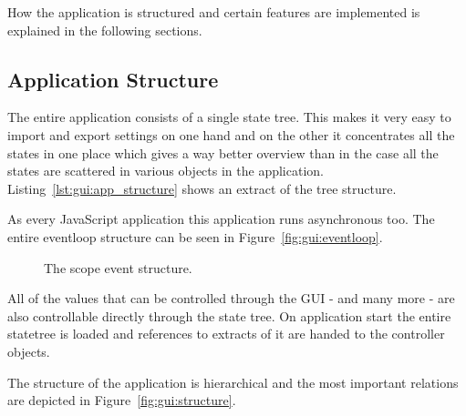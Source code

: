 How the application is structured and certain features are implemented is explained in the following sections.

%
%

\subsection{Application Structure}
\label{subsec:gui:application_structure}

The entire application consists of a single state tree. This makes it very easy to import and export settings on one hand and on the other it concentrates all the states in one place which gives a way better overview than in the case all the states are scattered in various objects in the application.
Listing~\ref{lst:gui:app_structure} shows an extract of the tree structure.

As every JavaScript application this application runs asynchronous too. The entire eventloop structure can be seen in Figure~\ref{fig:gui:eventloop}.

\begin{figure}
    \centering
    
    \caption[Scope event structure]{%
        The scope event structure.%
    }
    \label{fig:gui:eventstructure}
\end{figure}


All of the values that can be controlled through the GUI - and many more - are also controllable directly through the state tree.
On application start the entire statetree is loaded and references to extracts of it are handed to the controller objects.

The structure of the application is hierarchical and the most important relations are depicted in Figure~\ref{fig:gui:structure}.

